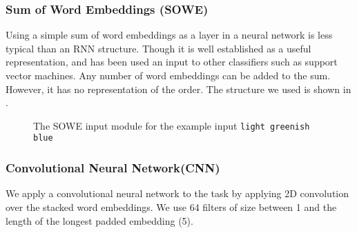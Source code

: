 \documentclass[11pt,a4paper]{article}
\newcommand{\natlang}[1]{\texttt{#1}}
\begin{document}
\subsubsection{Sum of Word Embeddings (SOWE)}
Using a simple sum of word embeddings as a layer in a neural network is less typical than an RNN structure.
Though it is well established as a useful representation, and has been used an input to other classifiers such as support vector machines. 
Any number of word embeddings can be added to the sum.
However, it has no representation of the order.
The structure we used is shown in .

\begin{figure}
	
	\caption{The SOWE input module for the example input \natlang{light greenish blue}}
	\label{fig:sowemod}
\end{figure}



\subsubsection{Convolutional Neural Network(CNN)}


We apply a convolutional neural network to the task by applying 2D convolution over the stacked word embeddings.
We use 64 filters of size between 1 and the length of the longest padded embedding (5).
\end{document}

